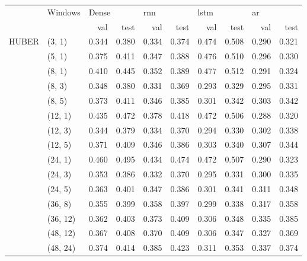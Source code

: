 \vspace{2em}
\begin{tabular}{ll|rr|rr|rr|rr}
\toprule
      &   Windows       & \multicolumn{2}{l}{Dense} & \multicolumn{2}{l}{\acrshort{rnn}} & \multicolumn{2}{l}{\acrshort{lstm}} & \multicolumn{2}{l}{\acrshort{ar}} \\*
      &          & val & test & val & test & val & test & val & test \\*
\midrule
\multirow{15}{*}{HUBER} & (3, 1) &     0.344 &      0.380 &   0.334 &    0.374 &    0.474 &     0.508 &  0.290 &   0.321 \\*
      & (5, 1) &     0.375 &      0.411 &   0.347 &    0.388 &    0.476 &     0.510 &  0.296 &   0.330 \\*
      & (8, 1) &     0.410 &      0.445 &   0.352 &    0.389 &    0.477 &     0.512 &  0.291 &   0.324 \\*
      & (8, 3) &     0.348 &      0.380 &   0.331 &    0.369 &    0.293 &     0.329 &  0.295 &   0.331 \\*
      & (8, 5) &     0.373 &      0.411 &   0.346 &    0.385 &    0.301 &     0.342 &  0.303 &   0.342 \\*
      & (12, 1) &     0.435 &      0.472 &   0.378 &    0.418 &    0.472 &     0.506 &  0.288 &   0.320 \\*
      & (12, 3) &     0.344 &      0.379 &   0.334 &    0.370 &    0.294 &     0.330 &  0.302 &   0.338 \\*
      & (12, 5) &     0.371 &      0.409 &   0.346 &    0.386 &    0.303 &     0.340 &  0.307 &   0.344 \\*
      & (24, 1) &     0.460 &      0.495 &   0.434 &    0.474 &    0.472 &     0.507 &  0.290 &   0.323 \\*
      & (24, 3) &     0.353 &      0.386 &   0.332 &    0.370 &    0.295 &     0.331 &  0.300 &   0.335 \\*
      & (24, 5) &     0.363 &      0.401 &   0.347 &    0.386 &    0.301 &     0.341 &  0.311 &   0.348 \\*
      & (36, 8) &     0.355 &      0.399 &   0.358 &    0.397 &    0.299 &     0.338 &  0.317 &   0.358 \\*
      & (36, 12) &     0.362 &      0.403 &   0.373 &    0.409 &    0.306 &     0.348 &  0.335 &   0.385 \\*
      & (48, 12) &     0.367 &      0.408 &   0.370 &    0.409 &    0.306 &     0.347 &  0.327 &   0.369 \\*
      & (48, 24) &     0.374 &      0.414 &   0.385 &    0.423 &    0.311 &     0.353 &  0.337 &   0.374 \\*
\bottomrule 
\end{tabular}

